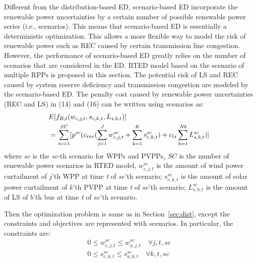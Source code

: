Different from the distribution-based ED, scenario-based ED incorporate the renewable power uncertainties by a certain number of possible renewable power series (i.e., scenarios). This means that scenario-based ED is essentially a deterministic optimization. This allows a more flexible way to model the risk of renewable power such as REC caused by certain transmission line congestion. However, the performance of scenario-based ED greatly relies on the number of scenarios that are considered in the ED. RTED model based on the scenario of multiple RPPs is proposed in this section. The potential risk of LS and REC caused by system reserve deficiency and transmission congestion are modeled by the scenario-based ED. The penalty cost caused by renewable power uncertainties (REC and LS) in (14) and (16) can be written using scenarios as:
\begin{equation} \label{SB_1}
\begin{aligned}
\begin{aligned}
&E[f_{R,t}(w_{c,j,t},s_{c,k,t},L_{s,b,t})]  \\
&=\sum_{{\it sc}=1}^{{\it SC}}[p^{sc}(c_{rec}(\sum_{{\it j}=1}^{{\it J}}w_{c,j,t}^{sc}+\sum_{{\it k}=1}^{{\it K}}s_{c,k,t}^{sc})
+c_{ls} \sum_{{\it b}=1}^{{\it Nb}}L_{s,b,t}^{sc})]
\end{aligned}
\end{aligned}
\end{equation}
where $sc$ is the {\it sc}-th scenario for WPPs and PVPPs, $SC$ is the number of renewable power scenarios in RTED model, $w_{c,j,t}^{sc}$ is the amount of wind power curtailment of $j$'th WPP at time {\it t} of $sc$'th scenario; $s_{c,k,t}^{sc}$ is the amount of solar power curtailment of $k$'th PVPP at time {\it t} of $sc$'th scenario; $L_{s,b,t}^{sc}$ is the amount of LS of $b$'th bus at time {\it t} of $sc$'th scenario.

Then the optimization problem is same as in Section~\ref{sec:dist}, except the constraints and objectives are represented with scenarios. In particular, the constraints are:
\begin{equation} \label{SB_2}
\begin{aligned}
0  \leq w_{c,j,t}^{sc} \leq w_{a,j,t}^{sc} \quad \forall j,t,sc \\
0  \leq s_{c,k,t}^{sc} \leq s_{a,k,t}^{sc} \quad \forall k,t,sc
\end{aligned}
\end{equation}


